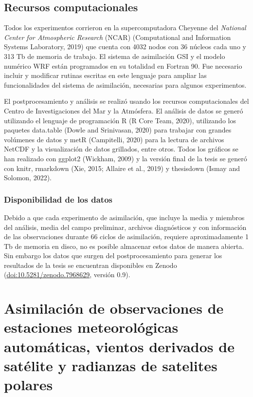 \documentclass[12pt,oneside,a4paper]{reedthesis}
\begin{document}
\hypertarget{recursos-computacionales}{%
\section{Recursos computacionales}\label{recursos-computacionales}}

Todos los experimentos corrieron en la supercomputadora Cheyenne del \emph{National Center for Atmospheric Research} (NCAR) (Computational and Information Systems Laboratory, 2019) que cuenta con 4032 nodos con 36 núcleos cada uno y 313 Tb de memoria de trabajo. El sistema de asimilación GSI y el modelo numérico WRF están programados en su totalidad en Fortran 90. Fue necesario incluir y modificar rutinas escritas en este lenguaje para ampliar las funcionalidades del sistema de asimilación, necesarias para algunos experimentos.

El postprocesamiento y análisis se realizó usando los recursos computacionales del Centro de Investigaciones del Mar y la Atmósfera. El análisis de datos se generó utilizando el lenguaje de programación R (R Core Team, 2020), utilizando los paquetes data.table (Dowle and Srinivasan, 2020) para trabajar con grandes volúmenes de datos y metR (Campitelli, 2020) para la lectura de archivos NetCDF y la visualización de datos grillados, entre otros.
Todos los gráficos se han realizado con ggplot2 (Wickham, 2009) y la versión final de la tesis se generó con knitr, rmarkdown (Xie, 2015; Allaire et al., 2019) y thesisdown (Ismay and Solomon, 2022).

\hypertarget{disponibilidad-de-los-datos}{%
\subsection{Disponibilidad de los datos}\label{disponibilidad-de-los-datos}}

Debido a que cada experimento de asimilación, que incluye la media y miembros del análisis, media del campo preliminar, archivos diagnósticos y con información de las observaciones durante 66 ciclos de asimilación, requiere aproximadamente 1 Tb de memoria en disco, no es posible almacenar estos datos de manera abierta. Sin embargo los datos que surgen del postprocesamiento para generar los resultados de la tesis se encuentran disponibles en Zenodo (\url{doi:10.5281/zenodo.7968629}, versión 0.9).

\hypertarget{cap-3-analisis}{%
\chapter{Asimilación de observaciones de estaciones meteorológicas automáticas, vientos derivados de satélite y radianzas de satelites polares}\label{cap-3-analisis}}
\end{document}
